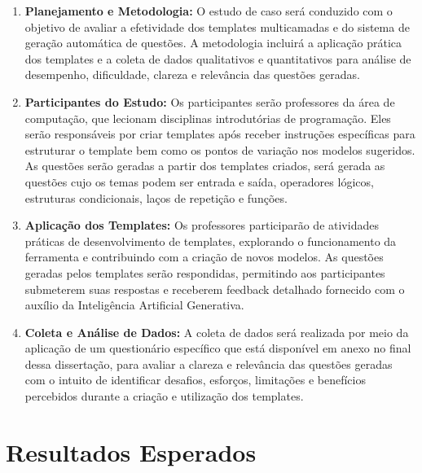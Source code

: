 \begin{enumerate}[label=\textbf{\alph*)}]
    \item \textbf{Planejamento e Metodologia:}  
    O estudo de caso será conduzido com o objetivo de avaliar a efetividade dos templates multicamadas e do sistema de geração automática de questões. A metodologia incluirá a aplicação prática dos templates e a coleta de dados qualitativos e quantitativos para análise de desempenho, dificuldade, clareza e relevância das questões geradas. 

    \item \textbf{Participantes do Estudo:}  
    Os participantes serão professores da área de computação, que lecionam disciplinas introdutórias de programação. Eles serão responsáveis por criar templates após receber instruções específicas para estruturar o template bem como os pontos de variação nos modelos sugeridos. As questões serão geradas a partir dos templates criados, será gerada as questões cujo os temas podem ser entrada e saída, operadores lógicos, estruturas condicionais, laços de repetição e funções.

    \item \textbf{Aplicação dos Templates:}  
    Os professores participarão de atividades práticas de desenvolvimento de templates, explorando o funcionamento da ferramenta e contribuindo com a criação de novos modelos. As questões geradas pelos templates serão respondidas, permitindo aos participantes submeterem suas respostas e receberem feedback detalhado fornecido com o auxílio da Inteligência Artificial Generativa.

    \item \textbf{Coleta e Análise de Dados:}  A coleta de dados será realizada por meio da aplicação de um questionário específico que está disponível em anexo no final dessa dissertação, para avaliar a clareza e relevância das questões geradas com o intuito de identificar desafios, esforços, limitações e benefícios percebidos durante a criação e utilização dos templates. 
\end{enumerate}

\section{Resultados Esperados}

